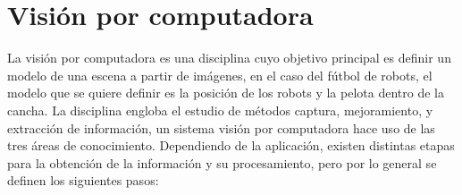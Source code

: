 
\section{Visión por computadora}

La visión por computadora es una disciplina cuyo objetivo principal es definir
un modelo de una escena a partir de imágenes\cite{cvLinda2001}, en el caso del
fútbol de robots, el modelo que se quiere definir es la posición de los robots y
la pelota dentro de la cancha. La disciplina engloba el estudio de métodos
captura, mejoramiento, y extracción de información, un sistema visión por
computadora hace uso de las tres áreas de conocimiento. Dependiendo de la
aplicación, existen distintas etapas para la obtención de la información y su
procesamiento, pero por lo general se definen los siguientes
pasos\cite{digitalImageProcessing2ed,wikiCV}:

